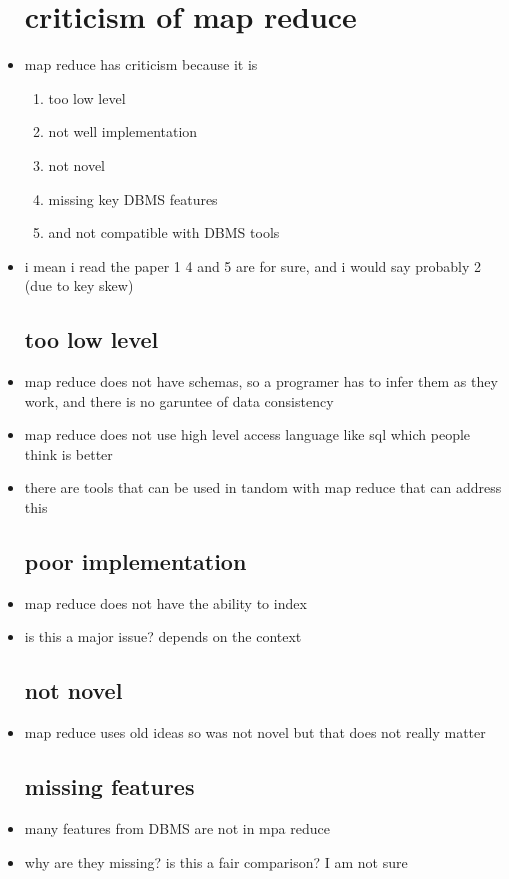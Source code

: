 \documentclass{article}
\begin{document}
\begin{itemize}
\section*{criticism of map reduce}
\item map reduce has criticism because it is 
\begin{enumerate}
    \item too low level 
    \item not well implementation
    \item not novel 
    \item missing key DBMS features 
    \item and not compatible with DBMS tools
\end{enumerate}
\item i mean i read the paper 1 4 and 5 are for sure, and i would say probably 2 (due to key skew)
\subsection*{too low level}
\item map reduce does not have schemas, so a programer has to infer them as they work, and there is no garuntee of data consistency 
\item map reduce does not use high level access language like sql which people think is better 
\item there are tools that can be used in tandom with map reduce that can address this 
\subsection*{poor implementation}
\item map reduce does not have the ability to index 
\item is this a major issue? depends on the context 
\subsection*{not novel}
\item map reduce uses old ideas so was not novel but that does not really matter 
\subsection*{missing features }
\item many features from DBMS are not in mpa reduce
\item why are they missing? is this a fair comparison? I am not sure 

\end{itemize}
\end{document}
